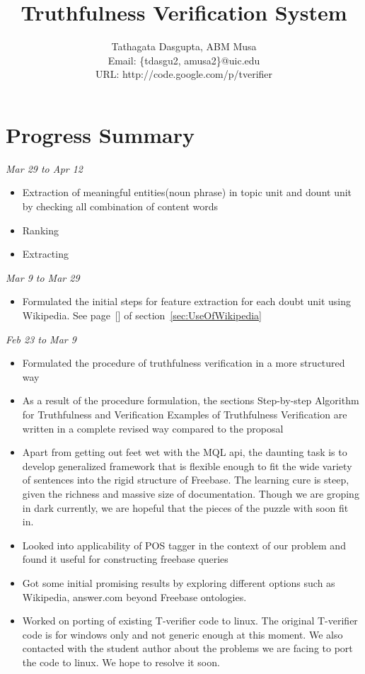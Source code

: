 \documentclass[11pt]{article}
\begin{document}
\title{Truthfulness Verification System}

\author{
Tathagata Dasgupta, ABM Musa\\
Email: \{tdasgu2, amusa2\}@uic.edu\\
URL: http://code.google.com/p/tverifier }

\date{}
\maketitle


\section{Progress Summary}


{\em Mar 29 to Apr 12}
\begin{itemize}
\item Extraction of meaningful entities(noun phrase) in topic unit and dount unit by checking all combination of content words
\item Ranking 
\item Extracting 
\end{itemize}


{\em Mar 9 to Mar 29}
\begin{itemize}
\item Formulated the initial steps for feature extraction for each doubt unit using Wikipedia. See page~[\pageref{March9to29}] of section~\ref{sec:UseOfWikipedia}
\end{itemize} 
{\em Feb 23 to Mar 9} 
\begin{itemize}
\item Formulated the procedure of truthfulness verification in a more structured way
\item As a result of the procedure formulation, the sections Step-by-step Algorithm for Truthfulness and Verification Examples of Truthfulness Verification are written in a complete revised way compared to the proposal
\item Apart from getting out feet wet with the MQL api, the daunting task is to develop generalized framework that is flexible enough to fit the wide variety of sentences into the rigid structure of Freebase. The learning cure is steep, given the richness and massive size of documentation. Though we are groping in dark currently, we are hopeful that the pieces of the puzzle with soon fit in.
\item Looked into applicability of POS tagger in the context of our problem and found it useful for constructing freebase queries
\item Got some initial promising results by exploring different options such as Wikipedia, answer.com beyond Freebase ontologies. 
\item Worked on porting of existing T-verifier code to linux. The original T-verifier code is for windows only and not generic enough at this moment. We also contacted with the student author about the problems we are facing to port the code to linux. We hope to resolve it soon.
\end{itemize}
\end{document}
